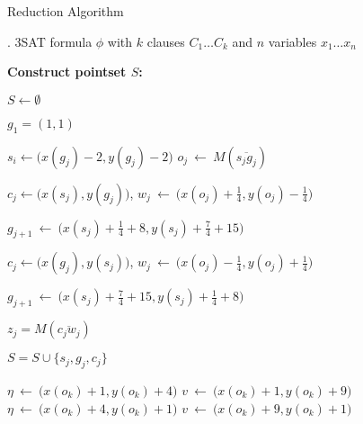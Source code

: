 \documentclass[a4paper,UKenglish]{lipics}
\newcommand{\eq}{{\ \leftarrow\ }}
\newcommand{\gre}{{g}}
\newcommand{\sma}{{s}}
\newcommand{\Seg}[1]{{\overline{#1}}}
\newcommand{\pset}{S}
\begin{document}
\begin{algorithm} 
\caption {{\sc Reduction Algorithm}} 
\label{alg:reduction}
\begin{algorithmic}[1]
	.\baselineskip
	\REQUIRE  3SAT formula $\phi$ with $k$ clauses $C_1 \dots C_k$ and $n$ variables $x_1 \dots x_n$
	

	\vspace{0.1in}
		
	\hspace{-0.2in} {\bf Construct pointset $S$:}  

	\STATE $\pset \leftarrow \emptyset$ \label{l:init}
	


 
	\STATE $\gre_1 = (1,1) $ \label{l:makeSStart}

	   \label{l:makeSLoop}

	\STATE $\sma_i \leftarrow \big(x(\gre_j)-2,y(\gre_j)-2\big) $
		 \STATE $o_j   \eq  M(\Seg{\sma_j\gre_j})$
	

	   
  
	\STATE $c_j \leftarrow \big(x(s_j), y(\gre_j) \big)$, $w_j  \eq \big(x(o_j)+\frac{1}{4},  y(o_j)-\frac{1}{4} \big)$

	\STATE  $\gre_{j+1} \eq \big (   x(s_{j}) + \frac{1}{4} + 8, y(s_{j}) + \frac{7}{4} +15 \big)$     		\label{l:ComputeNextEven}
    
		\ELSE
	\STATE $c_j \leftarrow \big(x(g_j), y(s_j) \big)$, $w_j  \eq \big(x(o_j)-\frac{1}{4},  y(o_j)+\frac{1}{4} \big)$ 
    
	\STATE  $\gre_{j+1} \eq \big ( x(s_{j}) + \frac{7}{4} + 15, y(s_{j}) + \frac{1}{4} + 8 \big)$     		\label{l:ComputeNextOdd}

  




	

	


	\ENDIF
	

  


\STATE $z_j = M(\Seg{c_jw_j})$

    \STATE $S = S \cup \{\sma_j,\gre_j, c_j\}$   \label{l:EndLoopPointSet}

	\ENDFOR






	  \label{l:ComputeV}
	  \STATE $\eta \eq \big( x(o_k)+1, y(o_k)+4\big)$  
      \STATE $v \eq \big( x(o_k)+1, y(o_k)+9\big)$  
		\ELSE
	   \STATE $\eta \eq \big( x(o_k)+4, y(o_k)+1\big)$  
      \STATE $v \eq \big( x(o_k)+9, y(o_k)+1\big)$  
	\ENDIF


\end{algorithmic}
\end{algorithm}
\end{document}
